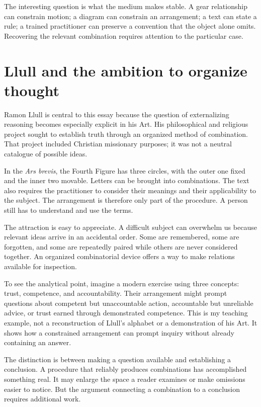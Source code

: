 \documentclass[11pt]{article}
\begin{document}
The interesting question is what the medium makes stable. A gear relationship
can constrain motion; a diagram can constrain an arrangement; a text can
state a rule; a trained practitioner can preserve a convention that the object
alone omits. Recovering the relevant combination requires attention to the
particular case.

\section{Llull and the ambition to organize thought}

Ramon Llull is central to this essay because the question of externalizing
reasoning becomes especially explicit in his Art. His philosophical and
religious project sought to establish truth through an organized method of
combination. That project included Christian missionary purposes; it was
not a neutral catalogue of possible ideas.\cite{priani}

In the \emph{Ars brevis}, the Fourth Figure has three circles, with the outer
one fixed and the inner two movable. Letters can be brought into combinations.
The text also requires the practitioner to consider their meanings and
their applicability to the subject.\cite{llull}
The arrangement is therefore only part of the procedure. A person still
has to understand and use the terms.

The attraction is easy to appreciate. A difficult subject can overwhelm us
because relevant ideas arrive in an accidental order. Some are remembered,
some are forgotten, and some are repeatedly paired while others are never
considered together. An organized combinatorial device offers a way to
make relations available for inspection.

To see the analytical point, imagine a modern exercise using three concepts:
trust, competence, and accountability. Their arrangement might prompt questions
about competent but unaccountable action, accountable but unreliable advice,
or trust earned through demonstrated competence. This is my teaching example,
not a reconstruction of Llull's alphabet or a demonstration of his Art.
It shows how a constrained arrangement can prompt inquiry without already
containing an answer.

The distinction is between making a question available and establishing a
conclusion. A procedure that reliably produces combinations has accomplished
something real. It may enlarge the space a reader examines or make omissions
easier to notice. But the argument connecting a combination to a conclusion
requires additional work.
\end{document}
